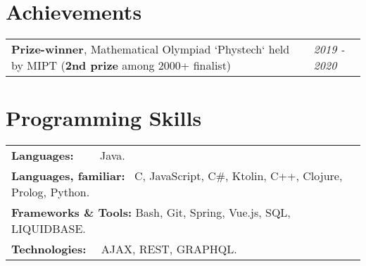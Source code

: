 \documentclass[letterpaper,10pt]{article}
\makeatletter
\newcommand{\tframed}[2][]{\tikz[baseline=(h.base)]\node[rndblock,#1] (h) {\color{black}{#2}};}
\newcommand*{\mystrut}{\rule[-0.2\baselineskip]{0pt}{0.8\baselineskip}}
\newcommand{\skill}[1]{\tframed[lightgray]{\mystrut#1}}
\newcommand{\resumeExpSubheading}[5]{
  \vspace{-1pt}\item
    \begin{tabular*}{0.97\textwidth}{l@{\extracolsep{\fill}}r}
      \textbf{#1}  & \textcolor{mygray}{#2} \\
      \textit{\small#3} & \textcolor{mygray}{\textit{\small #4}} \\
      {\scriptsize#5}
    \end{tabular*}\vspace{3pt}
}
\newcommand{\resumeSubHeadingListStart}{\begin{itemize}[leftmargin=*]}
\newcommand{\resumeSubHeadingListEnd}{\end{itemize}}
\newcommand{\resumeDesc}[1]{\begin{adjustwidth}{5pt}{0pt}\vspace{-2pt}{\small{#1}}\end{adjustwidth}}
\makeatother
\begin{document}
\vspace{-1pt}
\section{Achievements}
\resumeSubHeadingListStart
        \begin{tabular}{ll}
        \textbf{Prize-winner}, \quad Mathematical Olympiad `Phystech` held by MIPT (\textbf{2nd prize} among 2000+ finalist) & \quad\quad\quad\quad\quad \textit{\small 2019 - 2020}\\
        
        \end{tabular}
\resumeSubHeadingListEnd



\vspace{-1pt}
\section{Programming Skills}
 \resumeSubHeadingListStart
 \begin{tabular}{ll}
\textbf{Languages:} \qquad\qquad\,\,\,\,\,\,\,\,\,\, Java. \\
\textbf{Languages, familiar:} \quad\, C, JavaScript, C\#, Ktolin, C++, Clojure, Prolog, Python. \\
\textbf{Frameworks \& Tools:} \quad Bash, Git, Spring, Vue.js, SQL, LIQUIDBASE. \\
\textbf{Technologies:} \qquad\qquad\,\,\,\, AJAX, REST, GRAPHQL.\\
\end{tabular}
 \resumeSubHeadingListEnd

    
    

  
\end{document}
